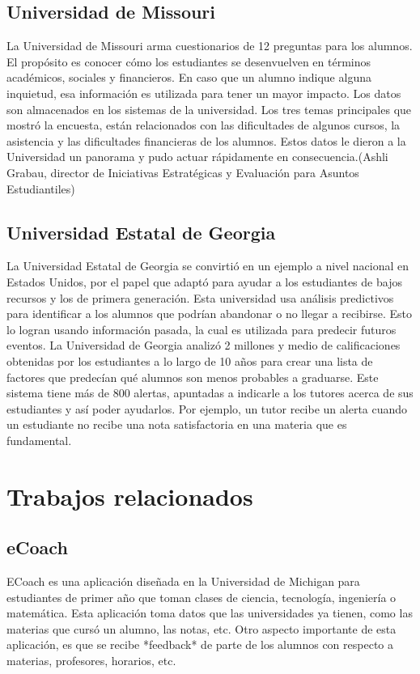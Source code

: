 \subsection[Universidad de Missouri]{Universidad de Missouri}
La Universidad de Missouri arma cuestionarios de 12 preguntas para los alumnos. El propósito es conocer cómo los estudiantes se desenvuelven en términos académicos, sociales y financieros. En caso que un alumno indique alguna inquietud, esa información es utilizada para tener un mayor impacto. Los datos son almacenados en los sistemas de la universidad.
Los tres temas principales que mostró la encuesta, están relacionados con las dificultades de algunos cursos, la asistencia y las dificultades financieras de los alumnos. Estos datos le dieron a la Universidad un panorama y pudo actuar rápidamente en consecuencia.(Ashli Grabau, director de Iniciativas Estratégicas y Evaluación para Asuntos Estudiantiles)

\subsection[Universidad Estatal de Georgia]{Universidad Estatal de Georgia}

La Universidad Estatal de Georgia se convirtió en un ejemplo a nivel nacional en Estados Unidos, por el papel que adaptó para ayudar a los estudiantes de bajos recursos y los de primera generación. 
Esta universidad usa análisis predictivos para identificar a los alumnos que podrían abandonar o no llegar a recibirse. Esto lo logran usando información pasada, la cual es utilizada para predecir futuros eventos. 
La Universidad de Georgia analizó 2 millones y medio de calificaciones obtenidas por los estudiantes a lo largo de 10 años para crear una lista de factores que predecían qué alumnos son menos probables a graduarse. Este sistema tiene más de 800 alertas, apuntadas a indicarle a los tutores acerca de sus estudiantes y así poder ayudarlos. Por ejemplo, un tutor recibe un alerta cuando un estudiante no recibe una nota satisfactoria en una materia que es fundamental. 





\section[Trabajos relacionados]{Trabajos relacionados}

\subsection[eCoach]{eCoach}
ECoach es una aplicación diseñada en la Universidad de Michigan para estudiantes de primer año que toman clases de ciencia, tecnología, ingeniería o matemática. Esta aplicación toma datos que las universidades ya tienen, como las materias que cursó un alumno, las notas, etc.
Otro aspecto importante de esta aplicación, es que se recibe *feedback* de parte de los alumnos con respecto a materias, profesores, horarios, etc.


